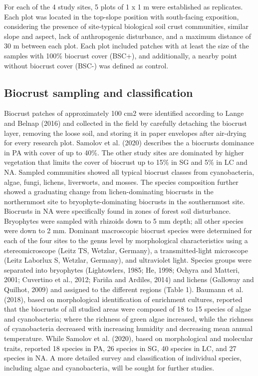 {For each of the 4 study sites, 5 plots of 1 x 1 m were established as replicates. Each plot was located in the top-slope position with south-facing exposition, considering the presence of site-typical biological soil crust communities, similar slope and aspect, lack of anthropogenic disturbance, and a maximum distance of 30 m between each plot. Each plot included patches with at least the size of the samples with 100\% biocrust cover (BSC+), and additionally, a nearby point without biocrust cover (BSC-) was defined as control.

\subsection{Biocrust sampling and classification}

Biocrust patches of approximately 100 cm2 were identified according to Lange and Belnap (2016) and collected in the field by carefully detaching the biocrust layer, removing the loose soil, and storing it in paper envelopes after air-drying for every research plot. Samolov et al. (2020) describes the a biocrusts dominance in PA with cover of up to 40\%. The other study sites are dominated by higher vegetation that limits the cover of biocrust up to 15\% in SG and 5\% in LC and NA. Sampled communities showed all typical biocrust classes from cyanobacteria, algae, fungi, lichens, liverworts, and mosses. The species composition further showed a graduating change from lichen-dominating biocrusts in the northernmost site to bryophyte-dominating biocrusts in the southernmost site. Biocrusts in NA were specifically found in zones of forest soil disturbance. Bryophytes were sampled with rhizoids down to 5 mm depth; all other species were down to 2 mm. Dominant macroscopic biocrust species were determined for each of the four sites to the genus level by morphological characteristics using a stereomicroscope (Leitz TS, Wetzlar, Germany), a transmitted-light microscope (Leitz Laborlux S, Wetzlar, Germany), and ultraviolet light. Species groups were separated into bryophytes (Lightowlers, 1985; He, 1998; Ochyra and Matteri, 2001; Cuvertino et al., 2012; Fariña and Ardiles, 2014) and lichens (Galloway and Quilhot, 2009) and assigned to the different regions (Table 1). Baumann et al. (2018), based on morphological identification of enrichment cultures, reported that the biocrusts of all studied areas were composed of 18 to 15 species of algae and cyanobacteria; where the richness of green algae increased, while the richness of cyanobacteria decreased with increasing humidity and decreasing mean annual temperature. While Samolov et al. (2020), based on morphological and molecular traits, reported 18 species in PA, 26 species in SG, 40 species in LC, and 27 species in NA. A more detailed survey and classification of individual species, including algae and cyanobacteria, will be sought for further studies.

}
